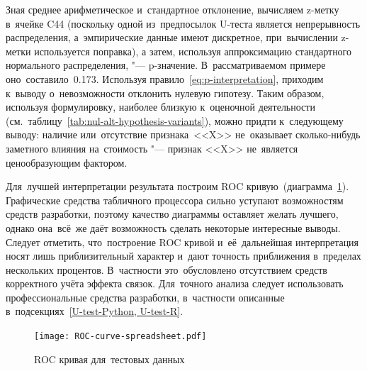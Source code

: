 \documentclass[]{scrreprt}
\begin{document}
Зная среднее арифметическое и~стандартное отклонение, вычисляем z-метку в~ячейке C44 (поскольку одной из~предпосылок U-теста является непрерывность распределения, а~эмпирические данные имеют дискретное, при~вычислении z-метки используется поправка), а затем, используя аппроксимацию стандартного нормального распределения, "--- p-значение. В~рассматриваемом примере оно~составило~0.173. Используя правило~\ref{eq:p-interpretation}, приходим к~выводу о~невозможности отклонить нулевую гипотезу. Таким образом, используя формулировку, наиболее близкую к~оценочной деятельности (см.~таблицу~\ref{tab:nul-alt-hypothesis-variants}), можно придти к~следующему выводу: наличие или~отсутствие признака~<<X>> не~оказывает сколько-нибудь заметного влияния на~стоимость "--- признак <<X>> не~является ценообразующим фактором.

Для~лучшей интерпретации результата построим ROC кривую~(диаграмма~\ref{fig:ROC-curve-spreadsheet}). Графические средства табличного процессора сильно уступают возможностям средств разработки, поэтому качество диаграммы оставляет желать лучшего, однако она~всё~же даёт возможность сделать некоторые интересные выводы. Следует отметить, что~построение ROC кривой и~её~дальнейшая интерпретация носят лишь приблизительный характер и~дают точность приближения в~пределах нескольких процентов. В~частности это~обусловлено отсутствием средств корректного учёта эффекта связок. Для~точного анализа следует использовать профессиональные средства разработки, в~частности описанные в~подсекциях~\cref{U-test-Python, U-test-R}.
%
\begin{figure}[ht]
	\centering
	\texttt{[image: ROC-curve-spreadsheet.pdf]}
	\caption{ROC кривая для~тестовых данных}
	\label{fig:ROC-curve-spreadsheet}
\end{figure}
% 
\end{document}

